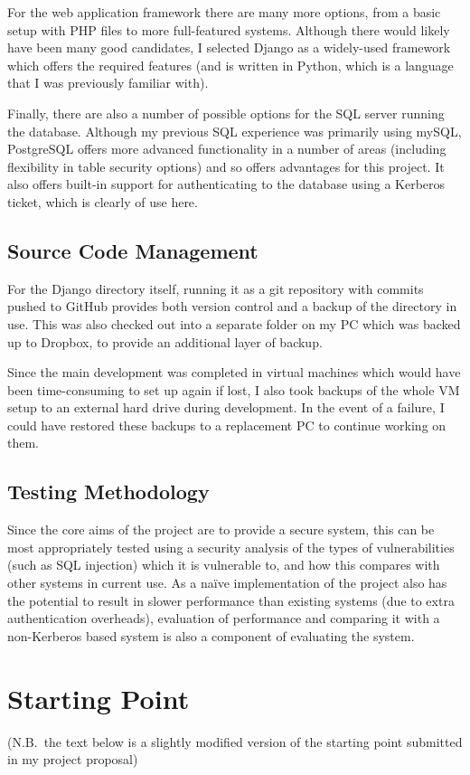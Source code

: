 \documentclass[12pt]{report}
\begin{document}
For the web application framework there are many more options, from a basic setup with PHP files to more full-featured systems. Although there would likely have been many good candidates, I selected Django as a widely-used framework which offers the required features (and is written in Python, which is a language that I was previously familiar with).

Finally, there are also a number of possible options for the SQL server running the database. Although my previous SQL experience was primarily using mySQL, PostgreSQL offers more advanced functionality in a number of areas (including flexibility in table security options) and so offers advantages for this project. It also offers built-in support for authenticating to the database using a Kerberos ticket, which is clearly of use here.

\subsection{Source Code Management}
For the Django directory itself, running it as a git repository with commits pushed to GitHub provides both version control and a backup of the directory in use. This was also checked out into a separate folder on my PC which was backed up to Dropbox, to provide an additional layer of backup.

Since the main development was completed in virtual machines which would have been time-consuming to set up again if lost, I also took backups of the whole VM setup to an external hard drive during development. In the event of a failure, I could have restored these backups to a replacement PC to continue working on them.

\subsection{Testing Methodology}
Since the core aims of the project are to provide a secure system, this can be most appropriately tested using a security analysis of the types of vulnerabilities (such as SQL injection) which it is vulnerable to, and how this compares with other systems in current use. As a na\"ive implementation of the project also has the potential to result in slower performance than existing systems (due to extra authentication overheads), evaluation of performance and comparing it with a non-Kerberos based system is also a component of evaluating the system.

\section{Starting Point}
(N.B.\ the text below is a slightly modified version of the starting point submitted in my project proposal)
\end{document}
